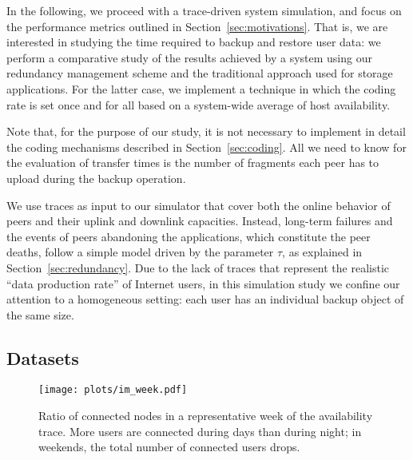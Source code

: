 In the following, we proceed with a trace-driven system simulation,
and focus on the performance metrics outlined in
Section~\ref{sec:motivations}. That is, we are interested in studying the
time required to backup and restore user data: we perform a
comparative study of the results achieved by a system using our
redundancy management scheme and the traditional approach used for
storage applications. For the latter case, we implement a technique in
which the coding rate is set once and for all based on a system-wide
average of host availability.

Note that, for the purpose of our study, it is not necessary to
implement in detail the coding mechanisms described in
Section~\ref{sec:coding}. All we need to know for the evaluation of
transfer times is the number of fragments each peer has to upload
during the backup operation.

We use traces as input to our simulator that cover both the online
behavior of peers and their uplink and downlink capacities. Instead,
long-term failures and the events of peers abandoning the
applications, which constitute the peer deaths, follow a simple model
driven by the parameter $\tau$, as explained in
Section~\ref{sec:redundancy}. Due to the lack of traces that represent
the realistic ``data production rate'' of Internet users, in this
simulation study we confine our attention to a homogeneous setting:
each user has an individual backup object of the same size.

\subsection{Datasets}\label{sec:datasets}

\begin{figure}
\centering
\texttt{[image: plots/im\_week.pdf]}
\caption{Ratio of connected nodes in a representative week of the availability
trace. More users are connected during days than during night; in weekends, the total number of connected users drops.}
\label{fig:im-week}
\end{figure}

